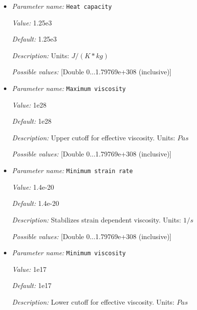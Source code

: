 \begin{itemize}
{\it Default:} 1.0


{\it Description:} Scaling coefficient for effective viscosity.


{\it Possible values:} [Double 0...1.79769e+308 (inclusive)]
\item {\it Parameter name:} {\tt Heat capacity}
\label{parameters:Material model/DiffusionDislocation/Heat capacity}


{\it Value:} 1.25e3


{\it Default:} 1.25e3


{\it Description:} Units: $J / (K * kg)$


{\it Possible values:} [Double 0...1.79769e+308 (inclusive)]
\item {\it Parameter name:} {\tt Maximum viscosity}
\label{parameters:Material model/DiffusionDislocation/Maximum viscosity}


{\it Value:} 1e28


{\it Default:} 1e28


{\it Description:} Upper cutoff for effective viscosity. Units: $Pa s$


{\it Possible values:} [Double 0...1.79769e+308 (inclusive)]
\item {\it Parameter name:} {\tt Minimum strain rate}
\label{parameters:Material model/DiffusionDislocation/Minimum strain rate}


{\it Value:} 1.4e-20


{\it Default:} 1.4e-20


{\it Description:} Stabilizes strain dependent viscosity. Units: $1 / s$


{\it Possible values:} [Double 0...1.79769e+308 (inclusive)]
\item {\it Parameter name:} {\tt Minimum viscosity}
\label{parameters:Material model/DiffusionDislocation/Minimum viscosity}


{\it Value:} 1e17


{\it Default:} 1e17


{\it Description:} Lower cutoff for effective viscosity. Units: $Pa s$



\end{itemize}
